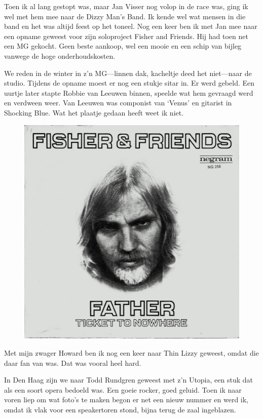 \documentclass[12pt,twoside, openright]{memoir}
\begin{document}
Toen ik al lang gestopt was, maar Jan Visser nog volop in de race was, ging ik wel met hem mee naar de Dizzy Man's Band. Ik kende wel wat mensen in die band en het was altijd feest op het toneel. Nog een keer ben ik met Jan mee naar een opname geweest voor zijn soloproject Fisher and Friends. Hij had toen net een MG gekocht. Geen beste aankoop, wel een mooie en een schip van bijleg vanwege de hoge onderhoudskosten.

We reden in de winter in z’n MG---linnen dak, kacheltje deed het niet---naar de studio. Tijdens de opname moest er nog een stukje sitar in. Er werd gebeld. Een uurtje later stapte Robbie van Leeuwen binnen, speelde wat hem gevraagd werd en verdween weer. Van Leeuwen was componist van ‘Venus’ en gitarist in Shocking Blue. Wat het plaatje gedaan heeft weet ik niet.

\begin{figure}
\centering
\includegraphics[width=\textwidth]{img/ch31/ff}
\end{figure}

Met mijn zwager Howard ben ik nog een keer naar Thin Lizzy geweest, omdat die daar fan van was. Dat was vooral heel hard. 

In Den Haag zijn we naar Todd Rundgren geweest met z’n Utopia, een stuk dat als een soort opera bedoeld was. Een goeie rocker, goed geluid. Toen ik naar voren liep om wat foto's te maken begon er net een nieuw nummer en werd ik, omdat ik vlak voor een speakertoren stond, bijna terug de zaal ingeblazen.
\end{document}
